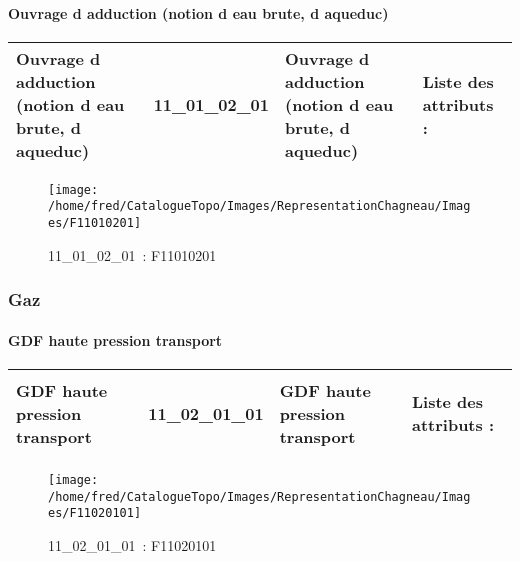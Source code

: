 \documentclass[12pt,titlepage,oneside]{book}
\begin{document}
\paragraph{Ouvrage d adduction (notion d eau brute, d aqueduc)}
\noindent
\vspace{\baselineskip}

\renewcommand{\arraystretch}{1.2}
\begin{supertabular}{|p{10cm}|c|p{13cm}|p{12cm}|}
 Ouvrage d adduction (notion d eau brute, d aqueduc) & 11\_01\_02\_01 & Ouvrage d adduction (notion d eau brute, d aqueduc) & Liste des attributs :
\begin{enumerate}
\end{enumerate}
\\
\hline
\end{supertabular}
\begin{figure}[h!]
  \hfill         %
  \begin{minipage}[t]{3cm}
    \begin{center}
      \texttt{[image: /home/fred/CatalogueTopo/Images/RepresentationChagneau/Images/F11010201]}
      \caption[~11\_01\_02\_01]{\small{11\_01\_02\_01~:} \tiny{F11010201}}\label{F11010201}
    \end{center}
  \end{minipage}
\end{figure}

\subsubsection{\large Gaz}
\paragraph{GDF haute pression transport}
\noindent
\vspace{\baselineskip}

\renewcommand{\arraystretch}{1.2}
\begin{supertabular}{|p{10cm}|c|p{13cm}|p{12cm}|}
 GDF haute pression transport & 11\_02\_01\_01 & GDF haute pression transport & Liste des attributs :
\begin{enumerate}
\end{enumerate}
\\
\hline
\end{supertabular}
\begin{figure}[h!]
  \hfill         %
  \begin{minipage}[t]{3cm}
    \begin{center}
      \texttt{[image: /home/fred/CatalogueTopo/Images/RepresentationChagneau/Images/F11020101]}
      \caption[~11\_02\_01\_01]{\small{11\_02\_01\_01~:} \tiny{F11020101}}\label{F11020101}
    \end{center}
  \end{minipage}
\end{figure}
\end{document}
